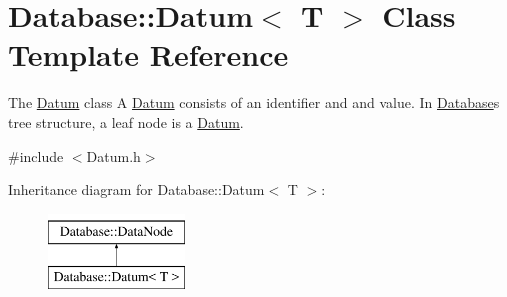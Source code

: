 \hypertarget{classDatabase_1_1Datum}{}\section{Database\+:\+:Datum$<$ T $>$ Class Template Reference}
\label{classDatabase_1_1Datum}


The \hyperlink{classDatabase_1_1Datum}{Datum} class A \hyperlink{classDatabase_1_1Datum}{Datum} consists of an identifier and and value. In \hyperlink{namespaceDatabase}{Database}\textquotesingle{}s tree structure, a leaf node is a \hyperlink{classDatabase_1_1Datum}{Datum}.  




{\ttfamily \#include $<$Datum.\+h$>$}

Inheritance diagram for Database\+:\+:Datum$<$ T $>$\+:\begin{figure}[H]
\begin{center}
\leavevmode
\includegraphics[height=2.000000cm]{classDatabase_1_1Datum}
\end{center}
\end{figure}
